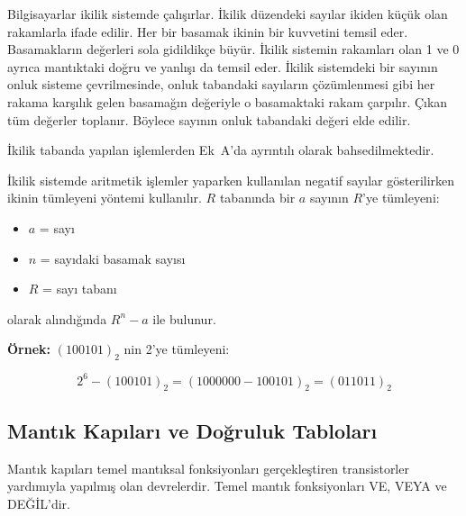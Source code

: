 Bilgisayarlar ikilik sistemde çalışırlar. İkilik düzendeki sayılar ikiden küçük olan rakamlarla ifade edilir. Her bir basamak ikinin bir kuvvetini temsil eder. Basamakların değerleri sola gidildikçe büyür. İkilik sistemin rakamları olan 1 ve 0 ayrıca mantıktaki doğru ve yanlışı da temsil eder. İkilik sistemdeki bir sayının onluk sisteme çevrilmesinde, onluk tabandaki sayıların çözümlenmesi gibi her rakama karşılık gelen basamağın değeriyle o basamaktaki rakam çarpılır. Çıkan tüm değerler toplanır. Böylece sayının onluk tabandaki değeri elde edilir.

İkilik tabanda yapılan işlemlerden Ek~A'da ayrıntılı olarak bahsedilmektedir.

İkilik sistemde aritmetik işlemler yaparken kullanılan negatif sayılar gösterilirken ikinin tümleyeni yöntemi kullanılır. $R$ tabanında bir $a$ sayının $R$'ye tümleyeni:

\begin{itemize}
    \item $a$ = sayı
    \item $n$ = sayıdaki basamak sayısı
    \item $R$ = sayı tabanı
\end{itemize}

olarak alındığında $R^n - a$ ile bulunur.

\textbf{Örnek:} $(100101)_2$ nin 2'ye tümleyeni:

\[
    2^6 - (100101)_2 = (1000000 - 100101)_2 = (011011)_2
\]


\subsection{Mantık Kapıları ve Doğruluk Tabloları}

Mantık kapıları temel mantıksal fonksiyonları gerçekleştiren transistorler yardımıyla yapılmış olan devrelerdir. Temel mantık fonksiyonları VE, VEYA ve DEĞİL'dir.

